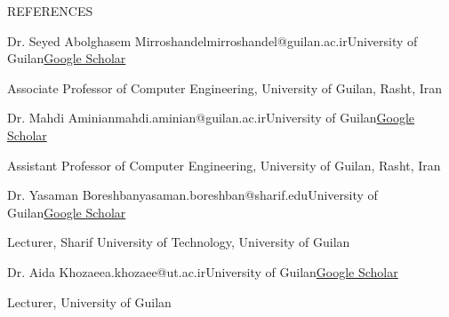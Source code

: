 \documentclass[]{CV}
\begin{document}
\pagebreak
\begin{section}{REFERENCES}
\begin{subsectionnobullet}{Dr. Seyed Abolghasem Mirroshandel}{mirroshandel@guilan.ac.ir}{University of Guilan}{\href{https://scholar.google.com/citations?user=WGH3eIsAAAAJ&hl=en}{Google Scholar}}
    \item {Associate Professor of Computer Engineering, University of Guilan, Rasht, Iran}
\end{subsectionnobullet}

\begin{subsectionnobullet}{Dr. Mahdi Aminian}{mahdi.aminian@guilan.ac.ir}{University of Guilan}{\href{https://scholar.google.com/citations?user=YVxXqIAAAAAJ&hl=en}{Google Scholar}}
\item {Assistant Professor of Computer Engineering, University of Guilan, Rasht, Iran}
\end{subsectionnobullet}


\begin{subsectionnobullet}{Dr. Yasaman Boreshban}{yasaman.boreshban@sharif.edu}{University of Guilan}{\href{https://scholar.google.com/citations?hl=en&user=dKskDg8AAAAJ&hl=en}{Google Scholar}}
\item {Lecturer, Sharif University of Technology, University of Guilan}
\end{subsectionnobullet}

\begin{subsectionnobullet}{Dr. Aida Khozaee}{a.khozaee@ut.ac.ir}{University of Guilan}{\href{https://scholar.google.com/citations?user=eO3UXvEAAAAJ&hl=en}{Google Scholar}}
\item {Lecturer, University of Guilan}
\end{subsectionnobullet}

\end{section}
\end{document}
